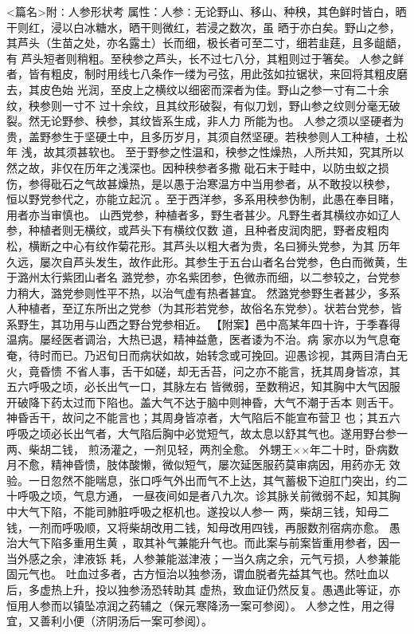 \documentclass[a4paper,12pt,UTF8,twoside]{ctexbook}
\begin{document}
<篇名>附∶人参形状考
属性：人参∶无论野山、移山、种秧，其色鲜时皆白，晒干则红，浸以白冰糖水，晒干则微红，若浸之数次，虽 
晒于亦白矣。野山之参，其芦头（生苗之处，亦名露土）长而细，极长者可至二寸，细若韭莛，且多龃龉，有 
芦头短者则稍粗。至秧参之芦头，长不过七八分，其粗则过于箸矣。 
人参之鲜者，皆有粗皮，制时用线七八条作一缕为弓弦，用此弦如拉锯状，来回将其粗皮磨去，其皮色始 
光润，至皮上之横纹以细密而深者为佳。野山之参一寸有二十余纹，秧参则一寸不 
过十余纹，且其纹形破裂，有似刀划，野山参之纹则分毫无破裂。然无论野参、秧参，其纹皆系生成，非人力 
所能为也。 
人参之须以坚硬者为贵，盖野参生于坚硬土中，且多历岁月，其须自然坚硬。若秧参则人工种植，土松年 
浅，故其须甚软也。 
至于野参之性温和，秧参之性燥热，人所共知，究其所以然之故，非仅在历年之浅深也。因种秧参者多撒 
砒石末于畦中，以防虫蚁之损伤，参得砒石之气故甚燥热，是以愚于治寒温方中当用参者，从不敢投以秧参， 
恒以野党参代之，亦能立起沉 。至于西洋参，多系用秧参伪制，此愚在奉目睹，用者亦当审慎也。 
山西党参，种植者多，野生者甚少。凡野生者其横纹亦如辽人参，种植者则无横纹，或芦头下有横纹仅数 
道，且种者皮润肉肥，野者皮粗肉松，横断之中心有纹作菊花形。其芦头以粗大者为贵，名曰狮头党参，为其 
历年久远，屡次自芦头发生，故作此形。其参生于五台山者名台党参，色白而微黄，生于潞州太行紫团山者名 
潞党参，亦名紫团参，色微赤而细，以二参较之，台党参力稍大，潞党参则性平不热，以治气虚有热者甚宜。 
然潞党参野生者甚少，多系人种植者，至辽东所出之党参（为其形若党参，故俗名东党参）。状若台党参，皆 
系野生，其功用与山西之野台党参相近。 
【附案】邑中高某年四十许，于季春得温病。屡经医者调治，大热已退，精神益惫，医者诿为不治。病 
家亦以为气息奄奄，待时而已。乃迟旬日而病状如故，始转念或可挽回。迎愚诊视，其两目清白无火，竟昏愦 
不省人事，舌干如磋，却无舌苔，问之亦不能言，抚其周身皆凉，其五六呼吸之顷，必长出气一口，其脉左右 
皆微弱，至数稍迟，知其胸中大气因服开破降下药太过而下陷也。盖大气不达于脑中则神昏，大气不潮于舌本 
则舌干。神昏舌干，故问之不能言也；其周身皆凉者，大气陷后不能宣布营卫 
也；其五六呼吸之顷必长出气者，大气陷后胸中必觉短气，故太息以舒其气也。遂用野台参一两、柴胡二钱， 
煎汤灌之，一剂见轻，两剂全愈。 
外甥王××年二十时，卧病数月不愈，精神昏愦，肢体酸懒，微似短气，屡次延医服药莫审病因，用药亦无 
效验。一日忽然不能喘息，张口呼气外出而气不上达，其气蓄极下迫肛门突出，约二十呼吸之顷，气息方通， 
一昼夜间如是者八九次。诊其脉关前微弱不起，知其胸中大气下陷，不能司肺脏呼吸之枢机也。遂投以人参一 
两，柴胡三钱，知母二钱，一剂而呼吸顺，又将柴胡改用二钱，知母改用四钱，再服数剂宿病亦愈。 
愚治大气下陷多重用生黄 ，取其补气兼能升气也。而此案与前案皆重用参者，因一当外感之余，津液铄 
耗，人参兼能滋津液；一当久病之余，元气亏损，人参兼能固元气也。 
吐血过多者，古方恒治以独参汤，谓血脱者先益其气也。然吐血以后，多虚热上升，投以独参汤恐转助其 
虚热，致血证仍然反复。愚遇此等证，亦恒用人参而以镇坠凉润之药辅之（保元寒降汤一案可参阅）。 
人参之性，用之得宜，又善利小便（济阴汤后一案可参阅）。 
\end{document}
